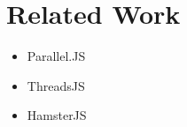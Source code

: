 \section{Related Work}\label{sec:related-work}

\begin{itemize}
	\item Parallel.JS
	\item ThreadsJS
	\item HamsterJS
\end{itemize}